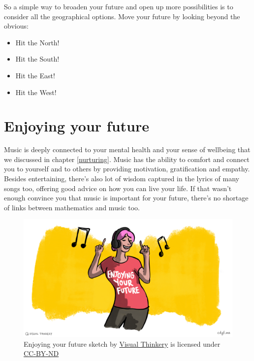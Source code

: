 \documentclass[
]{book}
\providecommand{\tightlist}{%
  \setlength{\itemsep}{0pt}\setlength{\parskip}{0pt}}
\begin{document}
So a simple way to broaden your future and open up more possibilities is to consider all the geographical options. Move your future by looking beyond the obvious:

\begin{itemize}
\tightlist
\item
  Hit the North!
\item
  Hit the South!
\item
  Hit the East!
\item
  Hit the West!
\end{itemize}

\hypertarget{enjoying}{%
\chapter{Enjoying your future}\label{enjoying}}

Music is deeply connected to your mental health and your sense of wellbeing that we discussed in chapter \ref{nurturing}. Music has the ability to comfort and connect you to yourself and to others by providing motivation, gratification and empathy. Besides entertaining, there's also lot of wisdom captured in the lyrics of many songs too, offering good advice on how you can live your life. If that wasn't enough convince you that music is important for your future, there's no shortage of links between mathematics and music too. \citep{behindthemusic, musicnmaths}

\begin{figure}

{\centering \includegraphics[width=1\linewidth]{images/Enjoying-your-future} 

}

\caption{Enjoying your future sketch by \href{https://visualthinkery.com/}{Visual Thinkery} is licensed under \href{https://creativecommons.org/licenses/by-nd/4.0/}{CC-BY-ND}}\label{fig:enjoying-fig}
\end{figure}
\end{document}
